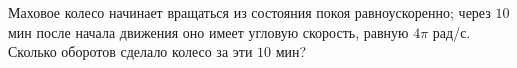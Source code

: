 Маховое колесо начинает вращаться из состояния покоя равноускоренно;
через $10$ мин после начала движения оно имеет угловую скорость, равную
$4\pi$ рад/с. Сколько оборотов сделало колесо за эти $10$ мин?
